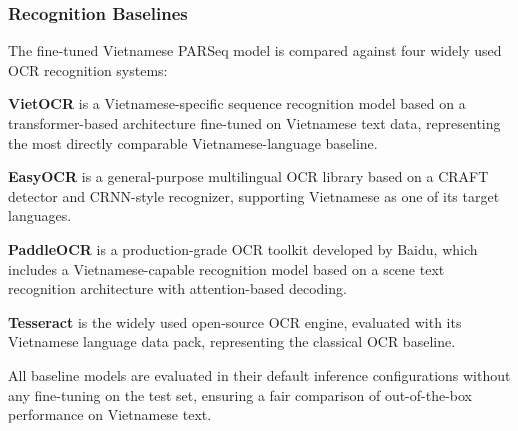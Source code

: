 \subsubsection{Recognition Baselines}

The fine-tuned Vietnamese PARSeq model is compared against four widely used OCR recognition systems:

\textbf{VietOCR} \cite{QuocBinhNguyen2020} is a Vietnamese-specific sequence recognition model based on a transformer-based architecture fine-tuned on Vietnamese text data, representing the most directly comparable Vietnamese-language baseline.

\textbf{EasyOCR} \cite{JaidedAI2020} is a general-purpose multilingual OCR library based on a CRAFT detector and CRNN-style recognizer, supporting Vietnamese as one of its target languages.

\textbf{PaddleOCR} \cite{Li2022PaddleOCR} is a production-grade OCR toolkit developed by Baidu, which includes a Vietnamese-capable recognition model based on a scene text recognition architecture with attention-based decoding.

\textbf{Tesseract} \cite{Smith2007} is the widely used open-source OCR engine, evaluated with its Vietnamese language data pack, representing the classical OCR baseline.

All baseline models are evaluated in their default inference configurations without any fine-tuning on the test set, ensuring a fair comparison of out-of-the-box performance on Vietnamese text.
